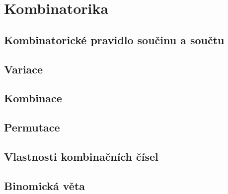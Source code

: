 
\newpage
    \section{Kombinatorika}
        \subsection{Kombinatorické pravidlo součinu a součtu}
        \subsection{Variace}
        \subsection{Kombinace}
        \subsection{Permutace}
        \subsection{Vlastnosti kombinačních čísel}
        \subsection{Binomická věta}
